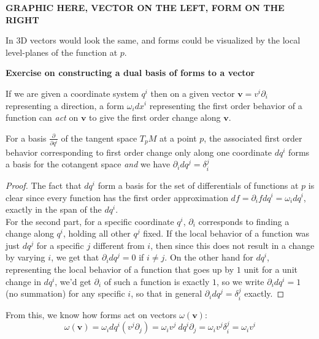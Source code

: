 	\textbf{GRAPHIC HERE, VECTOR ON THE LEFT, FORM ON THE RIGHT}
	
	In $3$D vectors would look the same, and forms could be visualized by the local level-planes of the function at $p$.
	
	\textbf{Exercise on constructing a dual basis of forms to a vector}
	
	If we are given a coordinate system $q^i$ then on a given vector $\mathbf v = v^i \partial_i$ representing a direction, a form $\omega_i dx^i$ representing the first order behavior of a function can \emph{act} on $\mathbf v$ to give the first order change along $\mathbf v$. 
	
	\begin{lemma}
		For a basis $\frac{\partial}{\partial q^i}$ of the tangent space $T_p M$ at a point $p$, the associated first order behavior corresponding to first order change only along one coordinate $dq^i$ forms a basis for the cotangent space \emph{and} we have $\partial_i dq^j = \delta^j_i$
	\end{lemma}
	\begin{proof}
		The fact that $dq^i$ form a basis for the set of differentials of functions at $p$ is clear since every function has the first order approximation $df = \partial_i f dq^i = \omega_i dq^i$, exactly in the span of the $dq^i$. \\
		For the second part, for a specific coordinate $q^i$, $\partial_i$ corresponds to finding a change along $q^i$, holding all other $q^j$ fixed. If the local behavior of a function was just $dq^j$ for a specific $j$ different from $i$, then since this does not result in a change by varying $i$, we get that $\partial_i dq^j = 0$ if $i\neq j$. On the other hand for $dq^i$, representing the local behavior of a function that goes up by $1$ unit for a unit change in $dq^i$, we'd get $\partial_i$ of such a function is exactly $1$, so we write $\partial_i dq^i = 1$ (no summation) for any specific $i$, so that in general $\partial_i dq^j = \delta_i^j$ exactly.
	\end{proof}
	
	From this, we know how forms act on vectors $\omega(\mathbf v)$:
	\begin{equation}
		\omega(\mathbf v) = \omega_i dq^i (v^j \partial_j) = \omega_i v^j ~ dq^i \partial_j = \omega_i v^j \delta^j_i = \omega_i v^i
	\end{equation}
	
